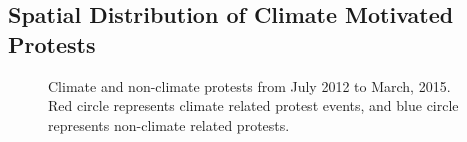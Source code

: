 \documentclass[9pt,twocolumn,twoside]{pnas-new}
\begin{document}

\subsection{Spatial Distribution of Climate Motivated Protests}
\begin{figure}[ht]
	\centering
	\caption{Climate and non-climate protests from July 2012 to March, 2015. Red circle represents climate related protest events, and blue circle represents non-climate related protests. }
\label{climate-map}
\end{figure}
\end{document}
